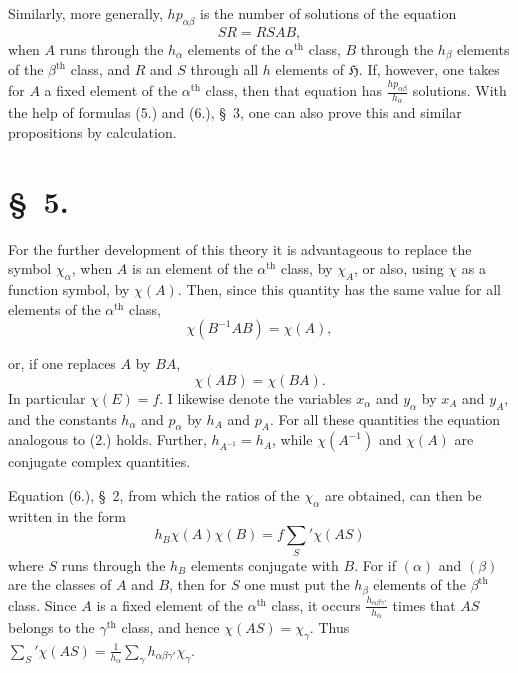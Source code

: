 \documentclass[11pt]{article}
\newcommand{\grp}{\mathfrak{H}}
\begin{document}
Similarly, more generally, $hp_{\alpha\beta}$ is the number of solutions of the equation
\begin{equation*}\tag{14.}
SR=RSAB,
\end{equation*}
when $A$ runs through the $h_\alpha$ elements of the $\alpha^{\text{th}}$ class, $B$ through the $h_\beta$ elements of the $\beta^{\text{th}}$ class, and $R$ and $S$ through all $h$ elements of $\grp$. If, however, one takes for $A$ a fixed element of the $\alpha^{\text{th}}$ class, then that equation has $\frac{hp_{\alpha\beta}}{h_\alpha}$ solutions. With the help of formulas (5.) and (6.), \S~3, one can also prove this and similar propositions by calculation.

\section*{\S~5.}

For the further development of this theory it is advantageous to replace the symbol $\chi_\alpha$, when $A$ is an element of the $\alpha^{\text{th}}$ class, by $\chi_A$, or also, using $\chi$ as a function symbol, by $\chi(A)$. Then, since this quantity has the same value for all elements of the $\alpha^{\text{th}}$ class,
\begin{equation*}\tag{1.}
\chi(B^{-1}AB)=\chi(A),
\end{equation*}


or, if one replaces $A$ by $BA$,
\begin{equation*}\tag{2.}
\chi(AB)=\chi(BA).
\end{equation*}
In particular $\chi(E)=f$. I likewise denote the variables $x_\alpha$ and $y_\alpha$ by $x_A$ and $y_A$, and the constants $h_\alpha$ and $p_\alpha$ by $h_A$ and $p_A$. For all these quantities the equation analogous to (2.) holds. Further, $h_{A^{-1}}=h_A$, while $\chi(A^{-1})$ and $\chi(A)$ are conjugate complex quantities.

Equation (6.), \S~2, from which the ratios of the $\chi_\alpha$ are obtained, can then be written in the form
\begin{equation*}\tag{3.}
h_B\chi(A)\chi(B)=f\sum_S'\chi(AS)
\end{equation*}
where $S$ runs through the $h_B$ elements conjugate with $B$. For if $(\alpha)$ and $(\beta)$ are the classes of $A$ and $B$, then for $S$ one must put the $h_\beta$ elements of the $\beta^{\text{th}}$ class. Since $A$ is a fixed element of the $\alpha^{\text{th}}$ class, it occurs $\frac{h_{\alpha\beta\gamma'}}{h_\alpha}$ times that $AS$ belongs to the $\gamma^{\text{th}}$ class, and hence $\chi(AS)=\chi_\gamma$. Thus $\sum_S'\chi(AS)=\frac{1}{h_\alpha}\sum_\gamma h_{\alpha\beta\gamma'}\chi_\gamma$.
\end{document}
